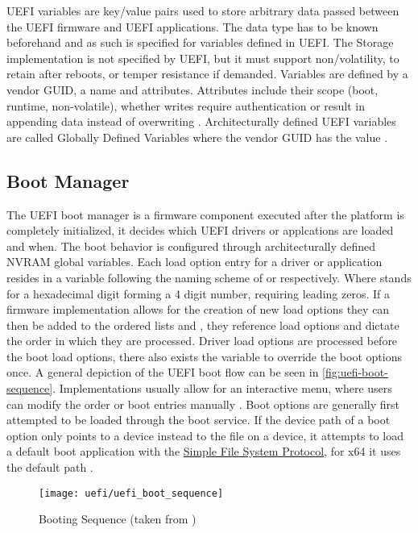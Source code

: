 \ac{UEFI} variables are key/value pairs used to store arbitrary data passed between the \ac{UEFI} firmware and \ac{UEFI} applications.
The data type has to be known beforehand and as such is specified for variables defined in \ac{UEFI}.
The Storage implementation is not specified by \ac{UEFI}, but it must support non\-/volatility, to retain after reboots, or temper resistance if demanded.
Variables are defined by a vendor \ac{GUID}, a name and attributes.
Attributes include their scope (boot, runtime, non-volatile), whether writes require authentication or result in appending data instead of overwriting \cite[Section 8.2]{uefi-spec}.
Architecturally defined \ac{UEFI} variables are called Globally Defined Variables where the vendor \ac{GUID} has the value  \cite[Section 3.3]{uefi-spec}.

\subsection{Boot Manager}
\label{sec:uefi-pi:uefi:boot-manager}

The \ac{UEFI} boot manager is a firmware component executed after the platform is completely initialized, it decides which \ac{UEFI} drivers or applcations are loaded and when.
The boot behavior is configured through architecturally defined \ac{NVRAM} global variables\cite[Section 3.1]{uefi-spec}.
Each load option entry for a driver or application resides in a variable following the naming scheme of  or  respectively. Where \code{\#} stands for a hexadecimal digit forming a 4 digit number, requiring leading zeros.
If a firmware implementation allows for the creation of new load options they can then be added to the ordered lists  and , they reference load options and dictate the order in which they are processed.
Driver load options are processed before the boot load options, there also exists the  variable to override the boot options once.
A general depiction of the \ac{UEFI} boot flow can be seen in \autoref{fig:uefi-boot-sequence}.
Implementations usually allow for an interactive menu, where users can modify the order or boot entries manually \cite[Section 3.1.1]{uefi-spec}.
Boot options are generally first attempted to be loaded through the  boot service.
If the device path of a boot option only points to a device instead to the file on a device, it attempts to load a default boot application with the \hyperref[lst:simple-file-system-protocol]{Simple File System Protocol}\cite[Section 3.1.2]{uefi-spec}, for x64 it uses the default path  \cite[Section 3.5]{uefi-spec}.

\begin{figure}[htb]%
    \centering%
    \texttt{[image: uefi/uefi\_boot\_sequence]}%
    \caption{Booting Sequence (taken from \cite[Figure 2-1]{uefi-spec})}%
    \label{fig:uefi-boot-sequence}%
\end{figure}
